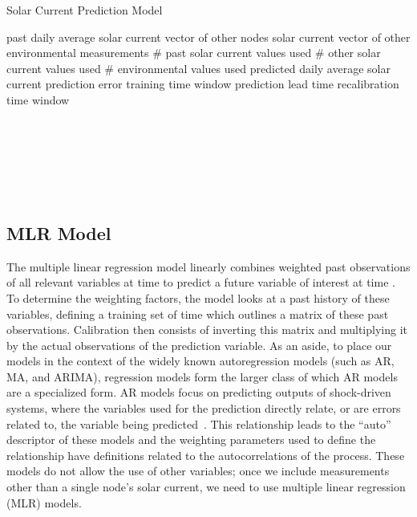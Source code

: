\documentclass[prodmode,acmtosn]{acmsmall}
\begin{document}
\begin{algorithm}[!b]
\caption{Solar Current Prediction Model}\label{alg:pred}
\begin{algorithmic}[1]
\State  past daily average solar current
\State  vector of other nodes solar current 
\State  vector of other environmental measurements
\State  \# past solar current values used
\State  \# other solar current values used
\State  \# environmental values used
\State  predicted daily average solar current
\State  prediction error
\State  training time window
\State  prediction lead time
\State  recalibration time window\\
\State \\

\State  \label{alg:setupline1}
\State 
\State 
\State  \label{alg:setupline2}
\State  \label{alg:calibration1}
\State  \label{alg:incerror1} \\ 

\State  
\State  \label{alg:setupline3}
\State  \label{alg:calibration2} \\

 \label{alg:loop}

\If{} \label{alg:recal} \\
\State 
\State 
\State 
\State 
\State 
\State  \label{alg:calibration3}
\EndIf\\
\State  \label{alg:error}
\State 
\State 
\State 
\State 
\State  \label{alg:prediction2}
\label{alg:pred:model}
\EndFor
\end{algorithmic}
\end{algorithm}

\subsection{MLR Model}
The multiple linear regression  model linearly combines  weighted past observations of all relevant variables at time  to predict a future variable of interest at time .
To determine the weighting factors, the model looks at a past history of these variables, defining a training set of time  which outlines a matrix of these past observations.
Calibration then consists of inverting this matrix and multiplying it by the actual observations of the prediction variable.
As an aside, to place our models in the context of the widely known autoregression models (such as AR, MA, and ARIMA), regression models form the larger class of which AR models are a specialized form.
AR models focus on predicting outputs of shock-driven systems, where the variables used for the prediction directly relate, or are errors related to, the variable being predicted~\cite{box1976}.
This relationship leads to the ``auto'' descriptor of these models and the weighting parameters used to define the relationship have definitions related to the autocorrelations of the process.
These models do not allow the use of other variables; once we include measurements other than a single node's solar current, we need to use multiple linear regression (MLR) models.
\end{document}
